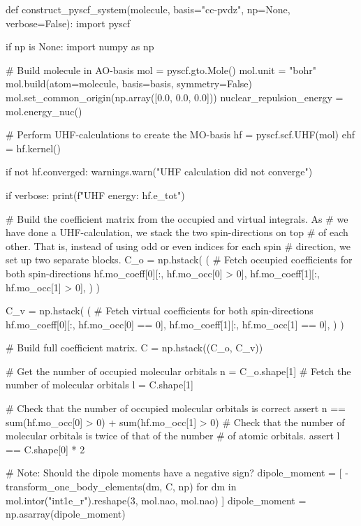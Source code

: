 \begin{python}
def construct_pyscf_system(molecule, basis="cc-pvdz", np=None, verbose=False):
    import pyscf

    if np is None:
        import numpy as np

    # Build molecule in AO-basis
    mol = pyscf.gto.Mole()
    mol.unit = "bohr"
    mol.build(atom=molecule, basis=basis, symmetry=False)
    mol.set_common_origin(np.array([0.0, 0.0, 0.0]))
    nuclear_repulsion_energy = mol.energy_nuc()

    # Perform UHF-calculations to create the MO-basis
    hf = pyscf.scf.UHF(mol)
    ehf = hf.kernel()

    if not hf.converged:
        warnings.warn("UHF calculation did not converge")

    if verbose:
        print(f"UHF energy: {hf.e_tot}")

    # Build the coefficient matrix from the occupied and virtual integrals. As
    # we have done a UHF-calculation, we stack the two spin-directions on top
    # of each other. That is, instead of using odd or even indices for each spin
    # direction, we set up two separate blocks.
    C_o = np.hstack(
        (
            # Fetch occupied coefficients for both spin-directions
            hf.mo_coeff[0][:, hf.mo_occ[0] > 0],
            hf.mo_coeff[1][:, hf.mo_occ[1] > 0],
        )
    )

    C_v = np.hstack(
        (
            # Fetch virtual coefficients for both spin-directions
            hf.mo_coeff[0][:, hf.mo_occ[0] == 0],
            hf.mo_coeff[1][:, hf.mo_occ[1] == 0],
        )
    )

    # Build full coefficient matrix.
    C = np.hstack((C_o, C_v))

    # Get the number of occupied molecular orbitals
    n = C_o.shape[1]
    # Fetch the number of molecular orbitals
    l = C.shape[1]

    # Check that the number of occupied molecular orbitals is correct
    assert n == sum(hf.mo_occ[0] > 0) + sum(hf.mo_occ[1] > 0)
    # Check that the number of molecular orbitals is twice of that of the number
    # of atomic orbitals.
    assert l == C.shape[0] * 2

    # Note: Should the dipole moments have a negative sign?
    dipole_moment = [
        -transform_one_body_elements(dm, C, np)
        for dm in mol.intor("int1e_r").reshape(3, mol.nao, mol.nao)
    ]
    dipole_moment = np.asarray(dipole_moment)


\end{python}

